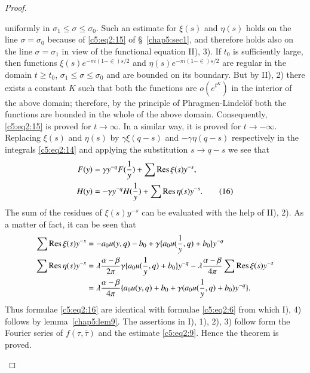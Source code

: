 \begin{proof}
\begin{enumerate}
uniformly in $\sigma_1 \leq \sigma \leq \sigma_0$. Such an estimate
for $\xi(s)$ and $\eta(s)$ holds on the line $\sigma=\sigma_0$ because
of \eqref{c5:eq2:15} of \S~\ref{chap5:sec1}, and therefore holds also on the line
$\sigma=\sigma_1$ in view of the functional equation II), 3). If $t_0$
is sufficiently large, then functions $\xi(s)e^{-\pi
  i(1-\in)s/2}$ and $\eta(s)e^{-\pi i(1-\in)s/2}$ are
regular in the domain $t\geq t_0$, $\sigma_1 \leq \sigma \leq
\sigma_0$ and are bounded on its boundary. But by II), 2) there exists
a constant $K$ such that both the functions \pageoriginale are
$o(e^{t^K})$ in the interior of the above domain; therefore, by the
principle of Phragmen-Lindel\"of both the functions are bounded in the
whole of the above domain. Consequently, \eqref{c5:eq2:15} is proved for
$t\to\infty$. In a similar way, it is proved for $t\to
-\infty$. Replacing $\xi(s)$ and $\eta(s)$ by $\gamma\xi(q-s)$ and
$-\gamma \eta(q-s)$ respectively in the integrals \eqref{c5:eq2:14} and applying
the substitution $s\to q-s$ we see that 
\begin{align*}
F(y) & = \gamma y^{-q} F(\frac{1}{y}) + \sum \operatorname{Res} \xi(s) y^{-s},\\
H(y) & = -\gamma y^{-q} H(\frac{1}{y}) + \sum \operatorname{Res} \eta(s)
y^{-s}. \tag{16}\label{c5:eq2:16} 
\end{align*}
The sum of the residues of $\xi(s)y^{-s}$ can be evaluated with the
help of II), 2). As a matter of fact, it can be seen that
{\fontsize{10}{12}\selectfont
\begin{align*}
\sum \operatorname{Res} \xi(s) y^{-s} & = -a_0 u(y,q) -b_0 + \gamma \{a_0
u(\frac{1}{y},q) + b_0\} y^{-q}\\
\sum \operatorname{Res} \eta(s) y^{-s} & = \lambda \frac{\alpha-\beta}{2\pi} \gamma
\{a_0 u(\frac{1}{y},q) + b_0\} y^{-q} -\lambda
\frac{\alpha-\beta}{4\pi} \sum \operatorname{Res} \xi(s) y^{-s}\\
& = \lambda \frac{\alpha-\beta}{4\pi} \{a_0u(y,q) + b_0 +
\gamma(a_0u(\frac{1}{y},q)+b_0) y^{-q}\}.
\end{align*}}\relax
Thus formulae \eqref{c5:eq2:16} are identical with formulae \eqref{c5:eq2:6} 
from which I), 4)
follows by lemma~\ref{chap5:lem9}. The assertions in I), 1), 2), 3) follow form the
Fourier series of $f(\tau,\bar{\tau})$ and the estimate \eqref{c5:eq2:9}. Hence the
theorem is proved.
\end{enumerate}
\end{proof}

